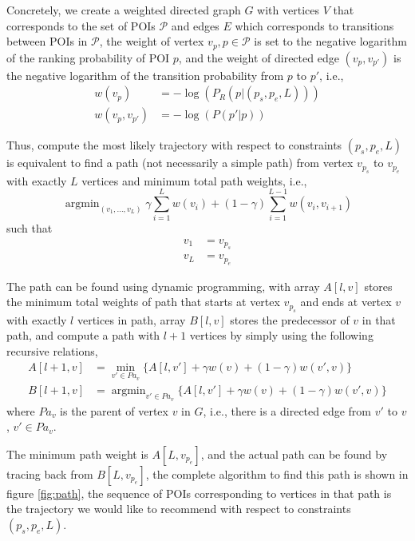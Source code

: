 \documentclass{sig-alternate-05-2015}
\DeclareMathOperator*{\argmin}{argmin}
\begin{document}
Concretely,
we create a weighted directed graph $G$ with vertices $V$ that corresponds to the set of POIs $\mathcal{P}$ and 
edges $E$ which corresponds to transitions between POIs in $\mathcal{P}$,
the weight of vertex $v_{p}, p \in \mathcal{P}$ is set to the negative logarithm of the ranking probability of POI $p$, 
and the weight of directed edge $(v_p, v_{p'})$ is the negative logarithm of the transition probability from $p$ to $p'$,
i.e.,
\begin{align*}
    w(v_{p})       & = -\log(P_R(p | (p_s, p_e, L))) \\
    w(v_p, v_{p'}) & = -\log(P(p' | p))
\end{align*}

Thus, compute the most likely trajectory with respect to constraints $(p_s, p_e, L)$ is
equivalent to find a path (not necessarily a simple path) from vertex $v_{p_s}$ to
$v_{p_e}$ with exactly $L$ vertices and minimum total path weights,
i.e.,
\begin{displaymath}
    \argmin_{(v_1, \dots, v_L)} \gamma \sum_{i=1}^{L} w(v_i) + (1 - \gamma) \sum_{i=1}^{L-1} w(v_i, v_{i+1})
\end{displaymath}
such that
\begin{align*}
    v_1 &= v_{p_s} \\
    v_L &= v_{p_e} 
\end{align*}
    
The path can be found using dynamic programming, 
with array $A[l, v]$ stores the minimum total weights of path 
that starts at vertex $v_{p_s}$ and ends at vertex $v$ with 
exactly $l$ vertices in path,
array $B[l, v]$ stores the predecessor of $v$ in that path,
and compute a path with $l+1$ vertices by simply using the following recursive relations,
\begin{align*}
    A[l+1, v] &= \min_{v' \in Pa_v} \{ A[l, v'] + \gamma w(v) + (1-\gamma) w(v', v) \} \\
    B[l+1, v] &= \argmin_{v' \in Pa_v} \{ A[l, v'] + \gamma w(v) + (1-\gamma) w(v', v) \} 
\end{align*}
where $Pa_v$ is the parent of vertex $v$ in $G$,
i.e., 
there is a directed edge from $v'$ to $v$, $v' \in Pa_v$.

The minimum path weight is $A[L, v_{p_e}]$,
and the actual path can be found by tracing back from $B[L, v_{p_e}]$,
the complete algorithm to find this path is shown in figure \ref{fig:path},
the sequence of POIs corresponding to vertices in that path is the 
trajectory we would like to recommend with respect to constraints $(p_s, p_e, L)$.
\end{document}
